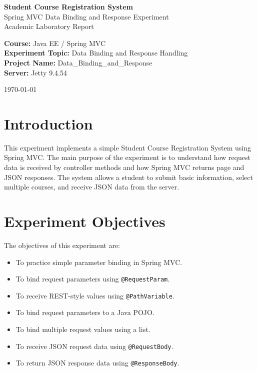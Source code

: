 \documentclass[12pt,a4paper]{article}
\begin{document}
\begin{titlepage}
    \centering
    \vspace*{2cm}
    {\Large \textbf{Student Course Registration System}}\\[0.4cm]
    {\large Spring MVC Data Binding and Response Experiment}\\[1.5cm]
    {\large Academic Laboratory Report}\\[2cm]
    \vfill
    \begin{flushleft}
        \textbf{Course:} Java EE / Spring MVC\\
        \textbf{Experiment Topic:} Data Binding and Response Handling\\
        \textbf{Project Name:} Data\_Binding\_and\_Response\\
        \textbf{Server:} Jetty 9.4.54\\
    \end{flushleft}
    \vfill
    {\large \today}
\end{titlepage}

\tableofcontents
\newpage

\section{Introduction}

This experiment implements a simple Student Course Registration System using Spring MVC.
The main purpose of the experiment is to understand how request data is received by controller
methods and how Spring MVC returns page and JSON responses. The system allows a student to submit
basic information, select multiple courses, and receive JSON data from the server.

\section{Experiment Objectives}

The objectives of this experiment are:

\begin{itemize}
    \item To practice simple parameter binding in Spring MVC.
    \item To bind request parameters using \texttt{@RequestParam}.
    \item To receive REST-style values using \texttt{@PathVariable}.
    \item To bind request parameters to a Java POJO.
    \item To bind multiple request values using a list.
    \item To receive JSON request data using \texttt{@RequestBody}.
    \item To return JSON response data using \texttt{@ResponseBody}.
\end{itemize}
\end{document}
